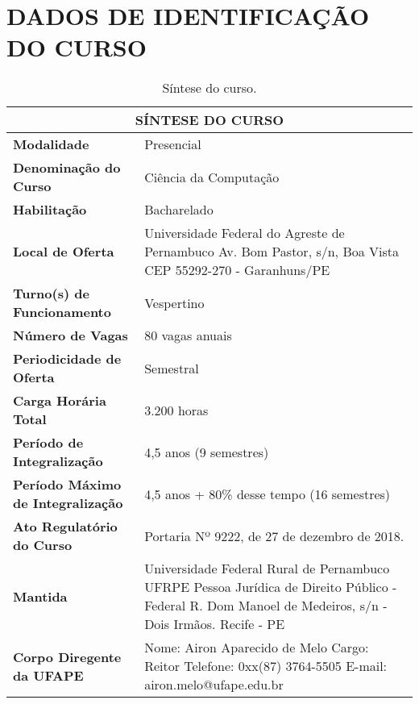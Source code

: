 
\chapter*[Dados de Identificação do Curso]{DADOS DE IDENTIFICAÇÃO DO CURSO}


\begin{center}
  \begin{footnotesize} 
  \begin{longtable}{lp{9.4cm}}
    \caption{\label{quadro:sintese-do-curso}Síntese do curso.}\\
    \toprule
    \multicolumn{2}{c}{\bfseries SÍNTESE DO CURSO} \\
    \midrule
    \textbf{Modalidade} & Presencial \\ \midrule
    \textbf{Denominação do Curso}	& Ciência da Computação \\ \midrule
    \textbf{Habilitação}	& Bacharelado \\ \midrule
    \textbf{Local de Oferta}	& Universidade Federal do Agreste de Pernambuco \newline Av. Bom Pastor, s/n, Boa Vista \newline CEP 55292-270 - Garanhuns/PE \\ \midrule
    \textbf{Turno(s) de Funcionamento}	 & Vespertino \\ \midrule
    \textbf{Número de Vagas}	& 80 vagas anuais \\ \midrule
    \textbf{Periodicidade de Oferta}	& Semestral \\ \midrule
    \textbf{Carga Horária Total} & 3.200 horas \\ \midrule
    \textbf{Período de Integralização}	& 4,5 anos (9 semestres) \\ \midrule
    \textbf{Período Máximo de Integralização} 	& 4,5 anos + 80\% desse tempo (16 semestres) \\ \midrule
    \textbf{Ato Regulatório do Curso} &	Portaria Nº 9222, de 27 de dezembro de 2018. \\ \midrule
    \textbf{Mantida}	& Universidade Federal Rural de Pernambuco UFRPE \newline Pessoa Jurídica de Direito Público - Federal \newline R. Dom Manoel de Medeiros, s/n - Dois Irmãos. Recife - PE \\ \midrule
    \textbf{Corpo Diregente da UFAPE}	& Nome: Airon Aparecido de Melo \newline Cargo: Reitor \newline Telefone: 0xx(87) 3764-5505 \newline E-mail: airon.melo@ufape.edu.br \\
\bottomrule
\end{longtable}
\end{footnotesize}
\end{center}

\newpage